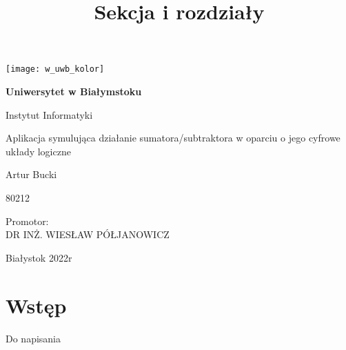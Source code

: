 \documentclass[12pt, a4paper, onside, polish]{article}				%
\title{Sekcja i rozdziały}						%
\begin{document}
\begin{titlepage}
	\begin{center}
	
		\texttt{[image: w\_uwb\_kolor]}
		
		\vspace{2cm}

	
		\Huge
        		\textbf{Uniwersytet w Białymstoku}
        		
        		\vspace{0.5cm}
        		\LARGE
        		Instytut Informatyki
        		
        		\vspace{1cm}
        		\LARGE
        		Aplikacja symulująca działanie sumatora/subtraktora w oparciu o jego cyfrowe układy logiczne 
        		
        		\vspace{1.5cm}
        		\large
        		Artur Bucki
        		
        		\large
        		80212
        		
        		\vspace{0.5cm}
        		
		\begin{flushright}
		Promotor:\\
		DR INŻ. WIESŁAW PÓŁJANOWICZ\\
		\end{flushright}


		\vspace*{\fill}
		\large
		Białystok 2022r
        		
	\end{center}
\end{titlepage}





\tableofcontents
\cleardoublepage


\section{Wstęp}
Do napisania


\cleardoublepage
\end{document}

